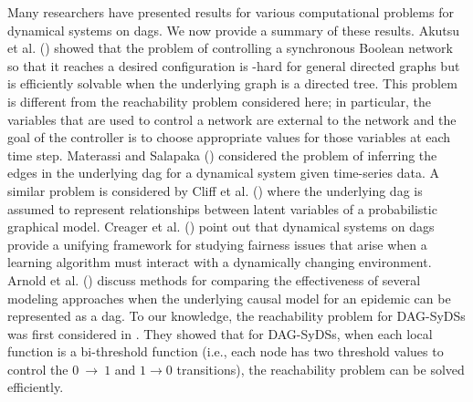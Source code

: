 Many researchers have presented results for various computational
problems for dynamical systems on dags.
We now provide a summary of these results.
Akutsu et al. (\citeyear{Akutsu-etal-2007}) showed that the problem
of controlling a synchronous Boolean network so that it
reaches a desired configuration is \cnp-hard for 
general directed graphs but is efficiently solvable 
when the underlying graph is a directed tree.
This problem is different from the reachability problem
considered here; in particular, the variables that are used to
control a network are external to the network and the goal of the controller
is to choose appropriate values for those variables at each time step.
Materassi and Salapaka (\citeyear{Materassi-etal-2013}) considered the
problem of inferring the edges in the underlying dag for a dynamical
system given time-series data.
A similar problem is considered by 
Cliff et al. (\citeyear{Cliff-etal-2016}) where the underlying
dag is assumed to represent relationships between latent 
variables of a probabilistic graphical model.
Creager et al. (\citeyear{Creager-etal-2020}) point out that dynamical systems
on dags provide a unifying framework for studying fairness issues that
arise when a learning algorithm must interact with a dynamically
changing environment.
Arnold et al. (\citeyear{Arnold-etal-2019}) discuss methods
for comparing the effectiveness of several modeling approaches 
when the underlying causal model
for an epidemic can be represented as a dag.
To our knowledge, the reachability problem for DAG-SyDSs 
was first considered in \cite{KKM+2013}. 
They showed that for DAG-SyDSs, when each local function is 
a bi-threshold function (i.e., each node has two threshold
values to control the $0 ~\rightarrow~  1$ and $1 \rightarrow 0$
transitions), the reachability problem can be solved efficiently.

